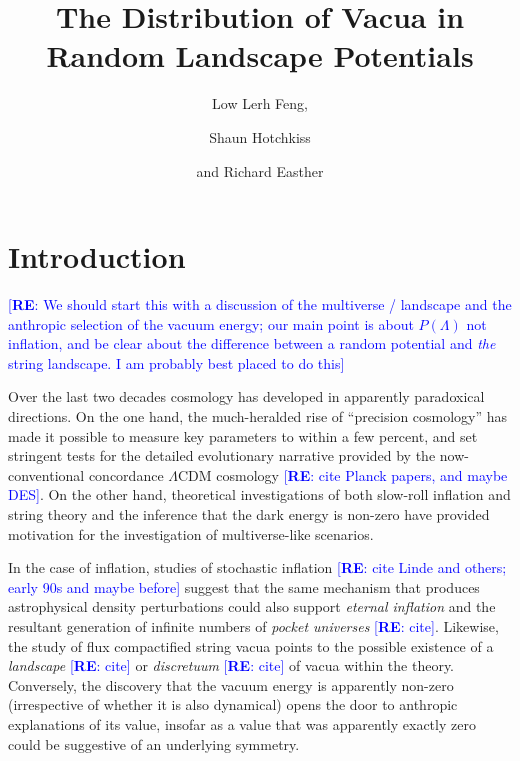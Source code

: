 \documentclass[12pt]{article}
\title{The Distribution of Vacua in Random Landscape Potentials}
\author{Low Lerh Feng,}
\author{Shaun Hotchkiss}
\author{and Richard Easther}
\affiliation{Department of Physics,\\ University of Auckland, \\Private Bag 92019,\\ Auckland, New Zealand}
\newcommand{\re}[1]{\textcolor{blue}{[{\bf RE}: #1]}}
\begin{document}
\maketitle

\section{Introduction}

\re{We should start this with a discussion of the multiverse / landscape and the anthropic selection of the vacuum energy; our main point is about $P(\Lambda)$ not inflation, and be clear about the difference between a random potential and {\em the} string landscape. I am probably best placed to do this} 

Over the last two decades cosmology has developed in apparently paradoxical directions. On the one hand, the much-heralded rise of ``precision cosmology'' has made it possible to measure key parameters to within a few percent, and set stringent tests for the detailed evolutionary narrative provided by the now-conventional concordance $\Lambda$CDM cosmology\cite{Planck2018}\cite{DES} \re{cite Planck papers, and maybe DES}. On the other hand, theoretical investigations of both slow-roll inflation and string theory and the inference that the dark energy is non-zero have  provided motivation for the investigation of multiverse-like scenarios. 

In the case of inflation, studies of stochastic inflation \cite{Linde1986}\cite{Adshead2007}\re{cite Linde and others; early 90s and maybe before}  suggest that the same mechanism that produces astrophysical density perturbations could also support {\em eternal inflation\/} and the resultant generation of infinite numbers of  {\em pocket universes\/} \cite{Guth2001}\re{cite}. Likewise, the study of flux compactified string vacua points to the possible existence of a {\em landscape\/} \cite{Susskind2003}\re{cite} or {\em discretuum\/} \re{cite}\cite{Bousso2000}   of vacua within the theory. Conversely, the discovery that the vacuum energy is apparently non-zero (irrespective of whether it is also dynamical) opens the door to anthropic explanations of its value, insofar as a value that was apparently exactly zero could be suggestive of an underlying symmetry. 
\end{document}
